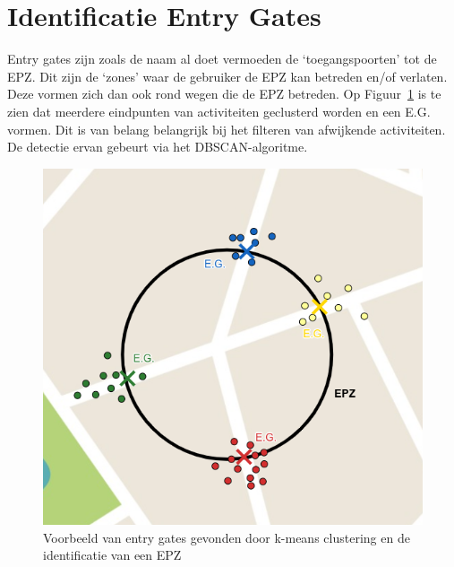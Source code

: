 \section{Identificatie Entry Gates}
Entry gates zijn zoals de naam al doet vermoeden de `toegangspoorten' tot de
\ac{EPZ}. Dit zijn de `zones' waar de gebruiker de \ac{EPZ} kan betreden en/of
verlaten. Deze vormen zich dan ook rond wegen die de \ac{EPZ} betreden. Op
Figuur~\ref{fig:entrygate} is te zien dat meerdere eindpunten van activiteiten
geclusterd worden en een \ac{E.G.} vormen. Dit is van belang belangrijk bij het
filteren van afwijkende activiteiten. De detectie ervan gebeurt via het
\ac{DBSCAN}-algoritme.
\begin{figure}
    \centering
    \includegraphics[width=0.5\linewidth]{fig/EPZ-mechanisme/Entry_Gate.png}
    \caption{Voorbeeld van entry gates gevonden door k-means clustering en de identificatie van een \ac{EPZ}}\label{fig:entrygate}
\end{figure}


